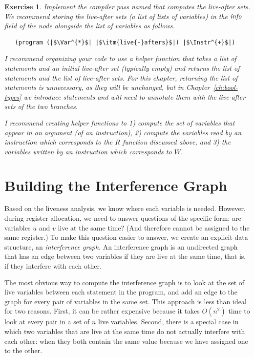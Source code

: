 \documentclass[11pt]{book}
\newtheorem{exercise}[theorem]{Exercise}
\begin{document}
\begin{exercise}\normalfont
Implement the compiler pass named  that computes
the live-after sets. We recommend storing the live-after sets (a list
of lists of variables) in the $\mathit{info}$ field of the 
node alongside the list of variables as follows.
\begin{lstlisting}
   (program (|$\Var^{*}$| |$\itm{live{-}afters}$|) |$\Instr^{+}$|)
\end{lstlisting}
I recommend organizing your code to use a helper function that takes a
list of statements and an initial live-after set (typically empty) and
returns the list of statements and the list of live-after sets.  For
this chapter, returning the list of statements is unnecessary, as they
will be unchanged, but in Chapter~\ref{ch:bool-types} we introduce
 statements and will need to annotate them with the live-after
sets of the two branches.

I recommend creating helper functions to 1) compute the set of
variables that appear in an argument (of an instruction), 2) compute
the variables read by an instruction which corresponds to the $R$
function discussed above, and 3) the variables written by an
instruction which corresponds to $W$.
\end{exercise}

\section{Building the Interference Graph}

Based on the liveness analysis, we know where each variable is needed.
However, during register allocation, we need to answer questions of
the specific form: are variables $u$ and $v$ live at the same time?
(And therefore cannot be assigned to the same register.)  To make this
question easier to answer, we create an explicit data structure, an
\emph{interference graph}.  An interference graph is an undirected
graph that has an edge between two variables if they are live at the
same time, that is, if they interfere with each other.

The most obvious way to compute the interference graph is to look at
the set of live variables between each statement in the program, and
add an edge to the graph for every pair of variables in the same set.
This approach is less than ideal for two reasons. First, it can be
rather expensive because it takes $O(n^2)$ time to look at every pair
in a set of $n$ live variables. Second, there is a special case in
which two variables that are live at the same time do not actually
interfere with each other: when they both contain the same value
because we have assigned one to the other.
\end{document}
